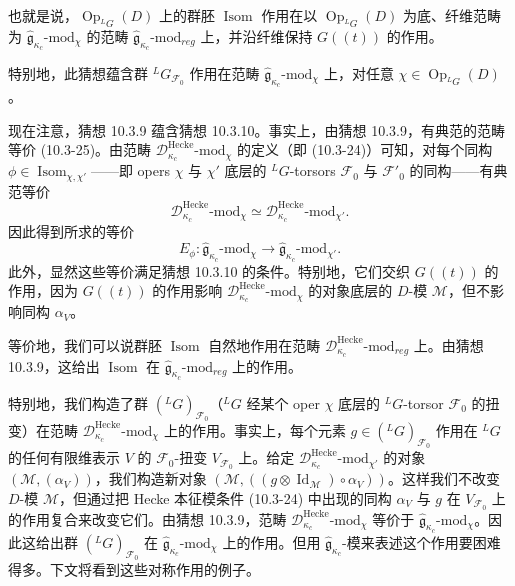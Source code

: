 也就是说，$\operatorname{Op}_{{}^LG}(D)$ 上的群胚 $\operatorname{Isom}$ 作用在以 $\operatorname{Op}_{{}^LG}(D)$ 为底、纤维范畴为 $\hat{\mathfrak{g}}_{\kappa_c}\text{-mod}_\chi$ 的范畴 $\hat{\mathfrak{g}}_{\kappa_c}\text{-mod}_{reg}$ 上，并沿纤维保持 $G((t))$ 的作用。

特别地，此猜想蕴含群 ${}^LG_{\mathcal{F}_0}$ 作用在范畴 $\hat{\mathfrak{g}}_{\kappa_c}\text{-mod}_\chi$ 上，对任意 $\chi\in\operatorname{Op}_{{}^LG}(D)$。

现在注意，猜想 10.3.9 蕴含猜想 10.3.10。事实上，由猜想 10.3.9，有典范的范畴等价 (10.3-25)。由范畴 $\mathcal{D}^{\text{Hecke}}_{\kappa_c}\text{-mod}_\chi$ 的定义（即 (10.3-24)）可知，对每个同构 $\phi\in\operatorname{Isom}_{\chi,\chi'}$——即 opers $\chi$ 与 $\chi'$ 底层的 ${}^LG$-torsors $\mathcal{F}_0$ 与 $\mathcal{F}'_0$ 的同构——有典范等价
\[
    \mathcal{D}^{\text{Hecke}}_{\kappa_c}\text{-mod}_\chi
    \simeq\mathcal{D}^{\text{Hecke}}_{\kappa_c}\text{-mod}_{\chi'}.
\]
因此得到所求的等价
\[
    E_\phi:\hat{\mathfrak{g}}_{\kappa_c}\text{-mod}_\chi
    \to\hat{\mathfrak{g}}_{\kappa_c}\text{-mod}_{\chi'}.
\]
此外，显然这些等价满足猜想 10.3.10 的条件。特别地，它们交织 $G((t))$ 的作用，因为 $G((t))$ 的作用影响 $\mathcal{D}^{\text{Hecke}}_{\kappa_c}\text{-mod}_\chi$ 的对象底层的 $D$-模 $\mathcal{M}$，但不影响同构 $\alpha_V$。

等价地，我们可以说群胚 $\operatorname{Isom}$ 自然地作用在范畴 $\mathcal{D}^{\text{Hecke}}_{\kappa_c}\text{-mod}_{reg}$ 上。由猜想 10.3.9，这给出 $\operatorname{Isom}$ 在 $\hat{\mathfrak{g}}_{\kappa_c}\text{-mod}_{reg}$ 上的作用。

特别地，我们构造了群 $({}^LG)_{\mathcal{F}_0}$（${}^LG$ 经某个 oper $\chi$ 底层的 ${}^LG$-torsor $\mathcal{F}_0$ 的扭变）在范畴 $\mathcal{D}^{\text{Hecke}}_{\kappa_c}\text{-mod}_\chi$ 上的作用。事实上，每个元素 $g\in({}^LG)_{\mathcal{F}_0}$ 作用在 ${}^LG$ 的任何有限维表示 $V$ 的 $\mathcal{F}_0$-扭变 $V_{\mathcal{F}_0}$ 上。给定 $\mathcal{D}^{\text{Hecke}}_{\kappa_c}\text{-mod}_{\chi'}$ 的对象 $(\mathcal{M},(\alpha_V))$，我们构造新对象 $(\mathcal{M},((g\otimes\operatorname{Id}_{\mathcal{M}})\circ\alpha_V))$。这样我们不改变 $D$-模 $\mathcal{M}$，但通过把 Hecke 本征模条件 (10.3-24) 中出现的同构 $\alpha_V$ 与 $g$ 在 $V_{\mathcal{F}_0}$ 上的作用复合来改变它们。由猜想 10.3.9，范畴 $\mathcal{D}^{\text{Hecke}}_{\kappa_c}\text{-mod}_\chi$ 等价于 $\hat{\mathfrak{g}}_{\kappa_c}\text{-mod}_\chi$。因此这给出群 $({}^LG)_{\mathcal{F}_0}$ 在 $\hat{\mathfrak{g}}_{\kappa_c}\text{-mod}_\chi$ 上的作用。但用 $\hat{\mathfrak{g}}_{\kappa_c}$-模来表述这个作用要困难得多。下文将看到这些对称作用的例子。

